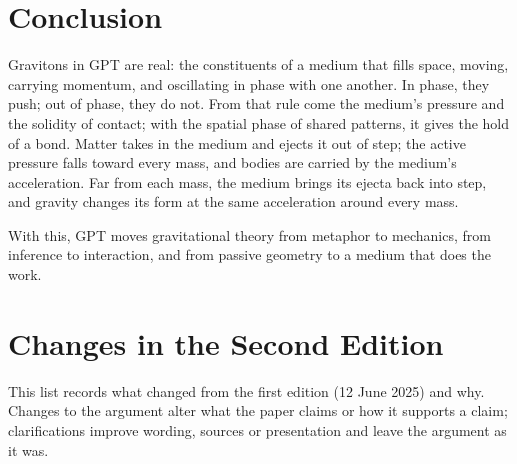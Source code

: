 \documentclass[11pt,a4paper]{article}
\begin{document}
\section*{Conclusion}

Gravitons in GPT are real: the constituents of a medium that fills space, moving, carrying momentum, and oscillating in phase with one another. In phase, they push; out of phase, they do not. From that rule come the medium's pressure and the solidity of contact; with the spatial phase of shared patterns, it gives the hold of a bond. Matter takes in the medium and ejects it out of step; the active pressure falls toward every mass, and bodies are carried by the medium's acceleration. Far from each mass, the medium brings its ejecta back into step, and gravity changes its form at the same acceleration around every mass.

With this, GPT moves gravitational theory from metaphor to mechanics, from inference to interaction, and from passive geometry to a medium that does the work.

\clearpage
\section*{Changes in the Second Edition}

This list records what changed from the first edition (12 June 2025) and why. Changes to the argument alter what the paper claims or how it supports a claim; clarifications improve wording, sources or presentation and leave the argument as it was.
\end{document}
